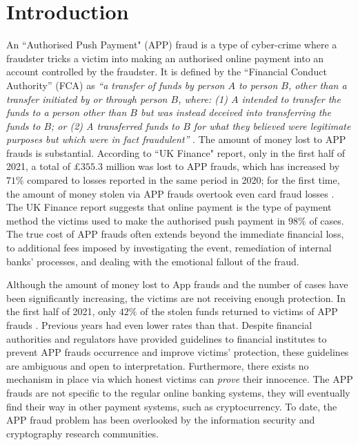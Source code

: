 

\section{Introduction}\label{sec::intro}

An  ``Authorised Push Payment" (APP) fraud is a type of cyber-crime where a fraudster tricks a victim into making an authorised online payment into an account controlled by the fraudster. It is defined by the ``Financial Conduct Authority” (FCA) as \textit{``a transfer of funds by person $A$ to person $B$, other than a transfer initiated by or through person $B$, where: (1) $A$ intended to transfer the funds to a person other than $B$ but was instead deceived into transferring the funds to $B$; or (2) A transferred funds to $B$ for what they believed were legitimate purposes but which were in fact fraudulent''} \cite{FCA-Glossary}. The amount of money lost to  APP frauds is   substantial. According to  ``UK Finance" report,   only in the first half of 2021, a total of £$355.3$ million was lost to APP frauds, which has increased by  $71\%$  compared to losses reported in the same period in 2020; for the first time, the amount of money stolen via  APP frauds overtook even   card fraud losses \cite{2021-Half-Year-Fraud-Update}. The UK Finance report suggests that  online  payment is the type of payment method the victims used to make the authorised push payment in  $98\%$  of cases. The true cost of APP frauds often extends beyond the immediate financial loss,  to additional fees imposed by  investigating the event, remediation of internal banks' processes, and  dealing with the emotional fallout of the fraud. %


Although the amount of money lost to  App frauds and the number of cases have been significantly  increasing, the victims are not receiving  enough protection.   In the first half of 2021, only $42\%$ of the stolen funds returned to victims of  APP frauds \cite{2021-Half-Year-Fraud-Update}. Previous years had even lower rates than that. Despite   financial authorities and regulators have provided  guidelines to financial institutes to prevent  APP frauds occurrence and improve victims' protection, these guidelines are  ambiguous and    open to interpretation. Furthermore,  there exists  no  mechanism in place via which honest victims can  \emph{prove} their innocence. The APP frauds are not specific to the regular online banking systems, they will eventually find their way in other payment systems, such as cryptocurrency. To date, the APP fraud problem has been overlooked by the information security and cryptography research communities.


